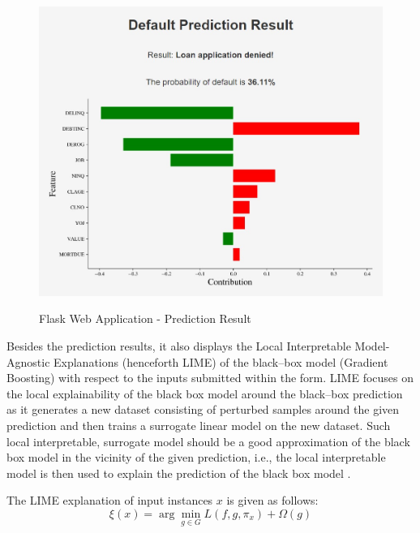 \begin{figure}[H]
\centering
\caption{Flask Web Application - Prediction Result}\vspace{0.5em}
\label{fig:flaskres}\
\includegraphics[width=130mm]{Figures/flask_app_result.jpg}

\vspace{-1em}
\end{figure}

Besides the prediction results, it also displays the Local Interpretable Model-Agnostic Explanations (henceforth LIME) of the black--box model (Gradient Boosting) with respect to the inputs submitted within the form.
LIME focuses on the local explainability of the black box model around the black--box prediction as it generates a new dataset consisting of perturbed samples around the given prediction and then trains a surrogate linear model on the new dataset.
Such local interpretable, surrogate model should be a good approximation of the black box model in the vicinity of the given prediction, i.e., the local interpretable model is then used to explain the prediction of the black box model \citep{ribeiro2016should}.

The LIME explanation of input instances $x$ is given as follows:
\begin{equation}\label{eq}
\xi(x) = \arg\min_{g \in G} L(f, g, \pi_x) + \Omega(g)
\end{equation}

